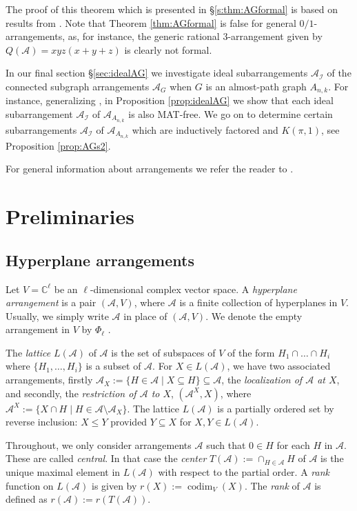\documentclass[12pt]{amsart}
\newcommand\CA{{\mathscr A}}
\newcommand\CI{{\mathcal I}}
\newcommand\BBC{{\mathbb C}}
\newcommand\codim{\operatorname{codim}}
\numberwithin{equation}{section}
\theoremstyle{plain}
\theoremstyle{definition}
\begin{document}
The proof of this theorem which is presented in \S \ref{s:thm:AGformal} is based on results from \cite{moellermueckschroehre:formal}.
Note that Theorem \ref{thm:AGformal} is false for general $0/1$-arrangements, as, for instance, the generic rational  $3$-arrangement given by $Q(\CA) = xyz(x+y+z)$ is clearly not formal.

In our final section \S \ref{sec:idealAG} we investigate ideal subarrangements $\CA_\CI$ of the connected subgraph arrangements $\CA_G$ when $G$ is an almost-path graph $A_{n,k}$.
For instance, generalizing \cite[Thm.~4.1]{cuntzkuehne:subgraphs}, in Proposition \ref{prop:idealAG} we show that each ideal subarrangement $\CA_\CI$ of $\CA_{A_{n,k}}$ is also MAT-free.
We go on to determine certain subarrangements $\CA_\CI$ of $\CA_{A_{n,k}}$ which are inductively factored and $K(\pi,1)$, see Proposition \ref{prop:AGs2}.

For general information about arrangements
we refer the reader to
\cite{orlikterao:arrangements}.

\section{Preliminaries}
\label{sect:prelims}

\subsection{Hyperplane arrangements}
\label{ssect:arrangements}
Let $V = \BBC^\ell$
be an $\ell$-dimensional complex vector space.
A \emph{hyperplane arrangement} is a pair
$(\CA, V)$, where $\CA$ is a finite collection of hyperplanes in $V$.
Usually, we simply write $\CA$ in place of $(\CA, V)$.
We denote the empty arrangement in $V$ by  $\Phi_\ell$ .

The \emph{lattice} $L(\CA)$ of $\CA$ is the set of subspaces of $V$ of
the form $H_1\cap \ldots \cap H_i$ where $\{ H_1, \ldots, H_i\}$ is a subset
of $\CA$.
For $X \in L(\CA)$, we have two associated arrangements,
firstly
$\CA_X :=\{H \in \CA \mid X \subseteq H\} \subseteq \CA$,
the \emph{localization of $\CA$ at $X$},
and secondly,
the \emph{restriction of $\CA$ to $X$}, $(\CA^X,X)$, where
$\CA^X := \{ X \cap H \mid H \in \CA \setminus \CA_X\}$.
The lattice $L(\CA)$ is a partially ordered set by reverse inclusion:
$X \le Y$ provided $Y \subseteq X$ for $X,Y \in L(\CA)$.

Throughout, we only consider arrangements $\CA$
such that $0 \in H$ for each $H$ in $\CA$.
These are called \emph{central}.
In that case the \emph{center}
$T(\CA) := \cap_{H \in \CA} H$ of $\CA$ is the unique
maximal element in $L(\CA)$  with respect
to the partial order.
A \emph{rank} function on $L(\CA)$
is given by $r(X) := \codim_V(X)$.
The \emph{rank} of $\CA$
is defined as $r(\CA) := r(T(\CA))$.
\end{document}

